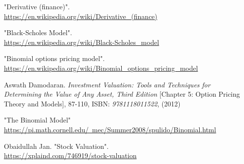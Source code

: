 \documentclass[12pt, letterpaper]{article}
\begin{document}
\begin{thebibliography}{9}
    "Derivative (finance)".
    \\
    \href{https://en.wikipedia.org/wiki/Derivative\_(finance)}{https://en.wikipedia.org/wiki/Derivative\_(finance)}

    "Black-Scholes Model".
    \\
    \href{https://en.wikipedia.org/wiki/Black-Scholes\_model}{https://en.wikipedia.org/wiki/Black-Scholes\_model}

    "Binomial options pricing model".
    \\
    \href{https://en.wikipedia.org/wiki/Binomial\_options\_pricing\_model}{https://en.wikipedia.org/wiki/Binomial\_options\_pricing\_model}
  
    Aswath Damodaran.
    \textit{Investment Valuation: Tools and Techniques for Determining the Value of Any Asset, Third Edition}
    [Chapter 5: Option Pricing Theory and Models], 87-110,
    ISBN: \textit{9781118011522},
    (2012)

    "The Binomial Model"
    \href{https://pi.math.cornell.edu/~mec/Summer2008/spulido/Binomial.html}{https://pi.math.cornell.edu/~mec/Summer2008/spulido/Binomial.html}

    Obaidullah Jan.
    "Stock Valuation".
    \\
    \href{https://xplaind.com/746919/stock-valuation}{https://xplaind.com/746919/stock-valuation}


\end{thebibliography}
\end{document}
